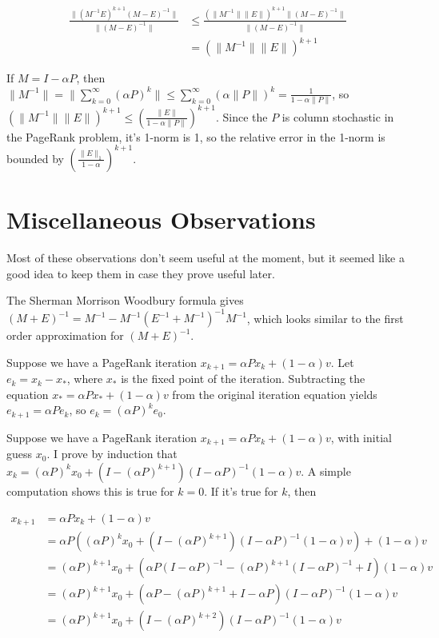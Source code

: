 \documentclass{article}
\newcommand \inv [1] {{#1}^{-1}} %
\begin{document}

\begin{align*}
\frac{\|(\inv M E)^{k+1}\inv{(M-E)}\|}{\|\inv{(M-E)}\|} &\leq
\frac{(\|\inv M\|\| E\|)^{k+1}\|(M-E)^{-1}\|}{\|(M-E)^{-1}\|} \\ &=
(\|\inv M\|\|E\|)^{k+1}
\end{align*}

If $M=I-\alpha P$, then $\|\inv M\| = \|\sum_{k=0}^\infty (\alpha
P)^k\| \leq \sum_{k=0}^\infty (\alpha\| P\|)^k = \frac 1
{1-\alpha\|P\|}$, so $(\|\inv M\|\|E\|)^{k+1} \leq
\left(\frac{\|E\|}{1-\alpha\|P\|}\right)^{k+1}$. Since the $P$ is
column stochastic in the PageRank problem, it's 1-norm is 1, so the
relative error in the 1-norm is bounded by
$\left(\frac{\|E\|_1}{1-\alpha}\right)^{k+1}$.

\section{Miscellaneous Observations}

Most of these observations don't seem useful at the moment, but it
seemed like a good idea to keep them in case they prove useful later.

The Sherman Morrison Woodbury formula gives $\inv{(M+E)}=\inv M-\inv
M\inv{(\inv E+\inv M)}\inv M$, which looks similar to the first order
approximation for $(M+E)^{-1}$.

Suppose we have a PageRank iteration $x_{k+1}=\alpha Px_k +
(1-\alpha)v$. Let $e_k=x_k-x_*$, where $x_*$ is the fixed point of the
iteration. Subtracting the equation $x_* = \alpha P x_* + (1-\alpha)v$
from the original iteration equation yields $e_{k+1}=\alpha P e_k$, so
$e_k = (\alpha P)^k e_0$.

Suppose we have a PageRank iteration $x_{k+1}=\alpha Px_k +
(1-\alpha)v$, with initial guess $x_0$. I prove by induction that $x_k
= (\alpha P)^k x_0 + (I-(\alpha P)^{k+1})(I-\alpha P)^{-1}
(1-\alpha)v$. A simple computation shows this is true for $k=0$. If
it's true for $k$, then

\begin{align*}
x_{k+1} &= \alpha Px_k + (1-\alpha)v\\ &= \alpha P \left((\alpha P)^k
x_0 + (I-(\alpha P)^{k+1})(I-\alpha P)^{-1} (1-\alpha)v\right) +
(1-\alpha)v\\ &= (\alpha P)^{k+1}x_0+\left(\alpha P(I-\alpha
P)^{-1}-(\alpha P)^{k+1}(I-\alpha P)^{-1} + I\right)(1-\alpha)v\\ &=
(\alpha P)^{k+1}x_0 + (\alpha P - (\alpha P)^{k+1} + I-\alpha
P)(I-\alpha P)^{-1}(1-\alpha)v\\ &= (\alpha P)^{k+1} x_0 + (I-(\alpha
P)^{k+2})(I-\alpha P)^{-1} (1-\alpha)v
\end{align*}
\end{document}
